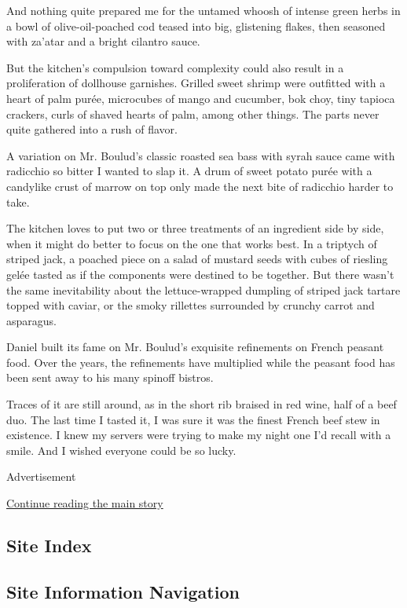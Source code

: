 And nothing quite prepared me for the untamed whoosh of intense green
herbs in a bowl of olive-oil-poached cod teased into big, glistening
flakes, then seasoned with za'atar and a bright cilantro sauce.

But the kitchen's compulsion toward complexity could also result in a
proliferation of dollhouse garnishes. Grilled sweet shrimp were
outfitted with a heart of palm purée, microcubes of mango and cucumber,
bok choy, tiny tapioca crackers, curls of shaved hearts of palm, among
other things. The parts never quite gathered into a rush of flavor.

A variation on Mr. Boulud's classic roasted sea bass with syrah sauce
came with radicchio so bitter I wanted to slap it. A drum of sweet
potato purée with a candylike crust of marrow on top only made the next
bite of radicchio harder to take.

The kitchen loves to put two or three treatments of an ingredient side
by side, when it might do better to focus on the one that works best. In
a triptych of striped jack, a poached piece on a salad of mustard seeds
with cubes of riesling gelée tasted as if the components were destined
to be together. But there wasn't the same inevitability about the
lettuce-wrapped dumpling of striped jack tartare topped with caviar, or
the smoky rillettes surrounded by crunchy carrot and asparagus.

Daniel built its fame on Mr. Boulud's exquisite refinements on French
peasant food. Over the years, the refinements have multiplied while the
peasant food has been sent away to his many spinoff bistros.

Traces of it are still around, as in the short rib braised in red wine,
half of a beef duo. The last time I tasted it, I was sure it was the
finest French beef stew in existence. I knew my servers were trying to
make my night one I'd recall with a smile. And I wished everyone could
be so lucky.

Advertisement

\protect\hyperlink{after-bottom}{Continue reading the main story}

\hypertarget{site-index}{%
\subsection{Site Index}\label{site-index}}

\hypertarget{site-information-navigation}{%
\subsection{Site Information
Navigation}\label{site-information-navigation}}

